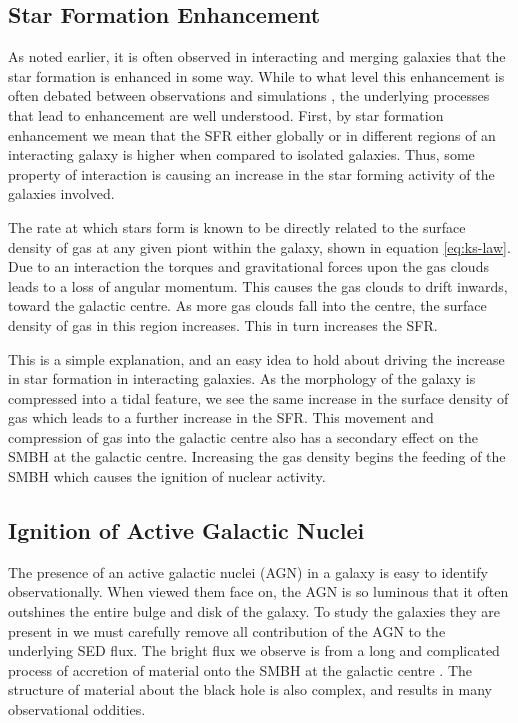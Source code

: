 \subsection{Star Formation Enhancement} 
\noindent As noted earlier, it is often observed in interacting and merging galaxies that the star formation is enhanced in some way. While to what level this enhancement is often debated between observations \citep{2003ApJ...582..668B, 2008MNRAS.385.1903L, 2011MNRAS.412..591P, 2022ApJS..261...34H} and simulations \citep{2007A&A...468...61D, 2008MNRAS.384..386C, 2013MNRAS.430.1901H, 2021MNRAS.503.3113M}, the underlying processes that lead to enhancement are well understood. First, by star formation enhancement we mean that the SFR either globally or in different regions of an interacting galaxy is higher when compared to isolated galaxies. Thus, some property of interaction is causing an increase in the star forming activity of the galaxies involved. 

The rate at which stars form is known to be directly related to the surface density of gas at any given piont within the galaxy, shown in equation \ref{eq:ks-law}. Due to an interaction the torques and gravitational forces upon the gas clouds leads to a loss of angular momentum. This causes the gas clouds to drift inwards, toward the galactic centre. As more gas clouds fall into the centre, the surface density of gas in this region increases. This in turn increases the SFR.

This is a simple explanation, and an easy idea to hold about driving the increase in star formation in interacting galaxies. As the morphology of the galaxy is compressed into a tidal feature, we see the same increase in the surface density of gas which leads to a further increase in the SFR. This movement and compression of gas into the galactic centre also has a secondary effect on the SMBH at the galactic centre. Increasing the gas density begins the feeding of the SMBH which causes the ignition of nuclear activity.

\subsection{Ignition of Active Galactic Nuclei}
\noindent The presence of an active galactic nuclei (AGN) in a galaxy is easy to identify observationally. When viewed them face on, the AGN is so luminous that it often outshines the entire bulge and disk of the galaxy. To study the galaxies they are present in we must carefully remove all contribution of the AGN to the underlying SED flux. The bright flux we observe is from a long and complicated process of accretion of material onto the SMBH at the galactic centre \citep[for an excellent breakdown of the structure and evolution of AGN see][]{2012agn..book.....B}. The structure of material about the black hole is also complex, and results in many observational oddities. 

